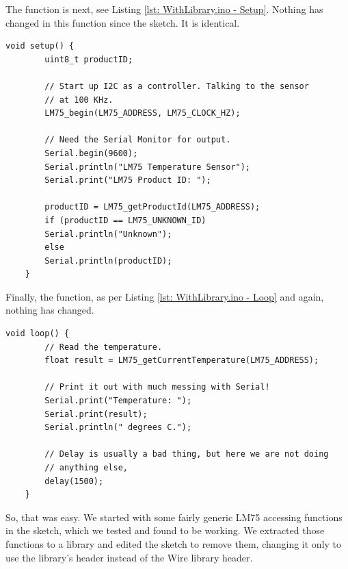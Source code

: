 The  function is next, see Listing \ref{lst: WithLibrary.ino - Setup}. Nothing has changed in this function since the  sketch. It is identical.


\begin{lstlisting}[caption={WithLibrary.ino - Setup.},label={lst: WithLibrary.ino - Setup}, style=myArduino, firstnumber=24]
    void setup() {
        uint8_t productID;

        // Start up I2C as a controller. Talking to the sensor
        // at 100 KHz.
        LM75_begin(LM75_ADDRESS, LM75_CLOCK_HZ);

        // Need the Serial Monitor for output.
        Serial.begin(9600);
        Serial.println("LM75 Temperature Sensor");
        Serial.print("LM75 Product ID: ");

        productID = LM75_getProductId(LM75_ADDRESS);
        if (productID == LM75_UNKNOWN_ID)
        Serial.println("Unknown");
        else
        Serial.println(productID);
    }
\end{lstlisting}

Finally, the  function, as per Listing \ref{lst: WithLibrary.ino - Loop} and again, nothing has changed.


\begin{lstlisting}[caption={WithLibrary.ino - Loop.},label={lst: WithLibrary.ino - Loop}, style=myArduino, firstnumber=47]
    void loop() {
        // Read the temperature.
        float result = LM75_getCurrentTemperature(LM75_ADDRESS);

        // Print it out with much messing with Serial!
        Serial.print("Temperature: ");
        Serial.print(result);
        Serial.println(" degrees C.");

        // Delay is usually a bad thing, but here we are not doing
        // anything else,
        delay(1500);
    }
\end{lstlisting}

So, that was easy. We started with some fairly generic LM75 accessing functions in the  sketch, which we tested and found to be working. We extracted those functions to a library and edited the sketch to remove them, changing it only to use the library's header instead of the Wire library header.
